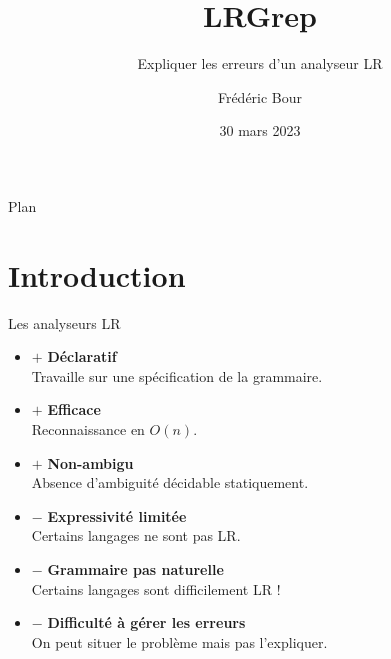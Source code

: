 \documentclass{beamer}          %
\title{LRGrep}  %
\subtitle{Expliquer les erreurs d'un analyseur LR}
\author{Frédéric Bour}                %
\institute{Tarides, Inria}          %
\date{30 mars 2023}                  %
\begin{document}
\begin{frame}
  \titlepage
\end{frame}

\begin{frame}{Plan}
  \tableofcontents
\end{frame}


\section{Introduction}

\newcommand\pro{\item[$+$]}
\newcommand\con{\item[$-$]}

\begin{frame}{Les analyseurs LR}

  \begin{itemize}
    \pro \textbf{Déclaratif} \\
         {\small Travaille sur une spécification de la grammaire.}
    \pro \textbf{Efficace} \\
         {\small Reconnaissance en $O(n)$.}
    \pro \textbf{Non-ambigu} \\
         {\small Absence d'ambiguité décidable statiquement.}
    \pause
    \con \textbf{Expressivité limitée} \\
         {\small Certains langages ne sont pas LR.}
    \con \textbf{Grammaire pas naturelle} \\
         {\small Certains langages sont difficilement LR !}
    \con \textbf{Difficulté à gérer les erreurs} \\
         {\small On peut situer le problème mais pas l'expliquer.}
  \end{itemize}

\end{frame}
\end{document}
